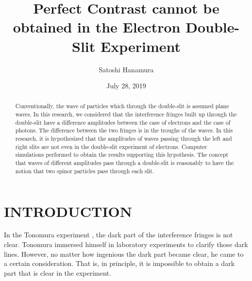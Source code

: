 \documentclass[%
 reprint,
 amsmath,amssymb,
 aps,
]{revtex4-1}
\numberwithin{equation}{section}%
\begin{document}


    \title{Perfect Contrast cannot be obtained in the Electron Double-Slit Experiment}
        \author{Satoshi Hanamura}
        \date{July 28, 2019}
        \begin{abstract}
            Conventionally, the wave of particles which through the double-slit is assumed plane waves. In this research, we considered that the interference fringes built up through the double-slit have a difference amplitudes between the case of electrons and the case of photons. The difference between the two fringes is in the troughs of the waves. In this research, it is hypothesized that the amplitudes of waves passing through the left and right slits are not even in the double-slit experiment of electrons. Computer simulations performed to obtain the results supporting this hypothesis. The concept that waves of different amplitudes pass through a double-slit is reasonably to have the notion that two spinor particles pass through each slit.
            
        \end{abstract}
    \maketitle


\section{\label{sec:INTRODUCTION}INTRODUCTION}


    In the Tonomura experiment \cite{Tonomura}, the dark part of the interference fringes is not clear. Tonomura immersed himself in laboratory experiments to clarify those dark lines. However, no matter how ingenious the dark part became clear, he came to a certain consideration. That is, in principle, it is impossible to obtain a dark part that is clear in the experiment.
    
\end{document}
